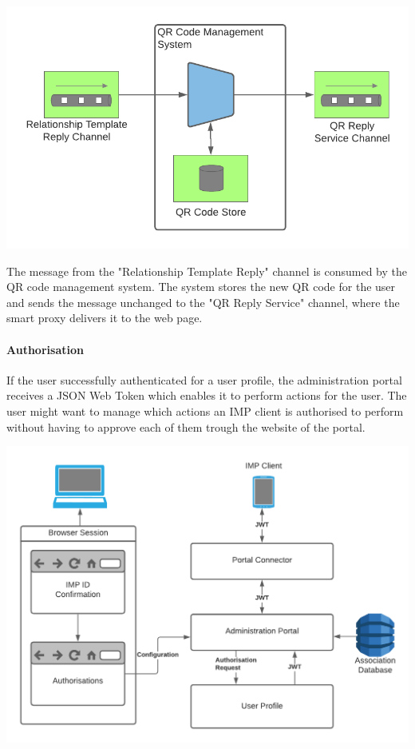 \documentclass[
     12pt,         %
     a4paper,      %
     BCOR=10mm,version=first,     %
     DIV=14,version=first,        %
     ]{scrreprt}
\begin{document}
\begin{center}
    \includegraphics[width=15cm]{Diagrams/Integration 1/Connection/Messaging 7.png}
\end{center}

The message from the "Relationship Template Reply" channel is consumed by the QR code management system. The system stores the new QR code for the user and sends the message unchanged to the "QR Reply Service" channel, where the smart proxy delivers it to the web page.

\paragraph{Authorisation}

If the user successfully authenticated for a user profile, the administration portal receives a JSON Web Token which enables it to perform actions for the user. The user might want to manage which actions an IMP client is authorised to perform without having to approve each of them trough the website of the portal.

\begin{center}
    \includegraphics[width=15cm]{Diagrams/Integration 1/Authorisation/Overview.png}
\end{center}
\end{document}
